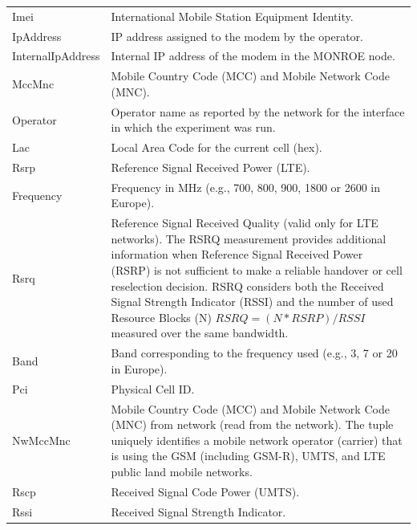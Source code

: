 \documentclass[a4paper,10pt]{article}
\newcommand{\monroe}{MONROE}
\begin{document}
\begin{appendices}
{\begin{longtable}{p{3cm}p{12cm}}
	Imei & International Mobile Station Equipment Identity.\\
	IpAddress & IP address assigned to the modem by the operator.\\
	InternalIpAddress & Internal IP address of the modem in the \monroe{} node.\\
	MccMnc & Mobile Country Code (MCC) and Mobile Network Code (MNC).\\
	Operator & Operator name as reported by the network for the interface in which the experiment was run.\\
	Lac & Local Area Code for the current cell (hex).\\
	Rsrp & Reference Signal Received Power (LTE).\\
	Frequency & Frequency in \si{\mega\hertz} (e.g., \num{700}, \num{800}, \num{900}, \num{1800} or \num{2600} in Europe).\\
	Rsrq & Reference Signal Received Quality (valid only for LTE networks). The RSRQ measurement provides additional information when Reference Signal Received Power (RSRP) is not sufficient to make a reliable handover or cell reselection decision. RSRQ considers both the Received Signal Strength Indicator (RSSI) and the number of used Resource Blocks (N) $\mathit{RSRQ} = (N * \mathit{RSRP}) / \mathit{RSSI}$ measured over the same bandwidth.\\
	Band & Band corresponding to the frequency used (e.g., \num{3}, \num{7} or \num{20} in Europe).\\
	Pci & Physical Cell ID.\\
	NwMccMnc & Mobile Country Code (MCC) and Mobile Network Code (MNC) from network (read from the network). The tuple uniquely identifies a mobile network operator (carrier) that is using the GSM (including GSM-R), UMTS, and
	LTE public land mobile networks.\\
	Rscp & Received Signal Code Power (UMTS).\\
	Rssi & Received Signal Strength Indicator.\\
	\bottomrule
\end{longtable}
}


\end{appendices}
\end{document}
